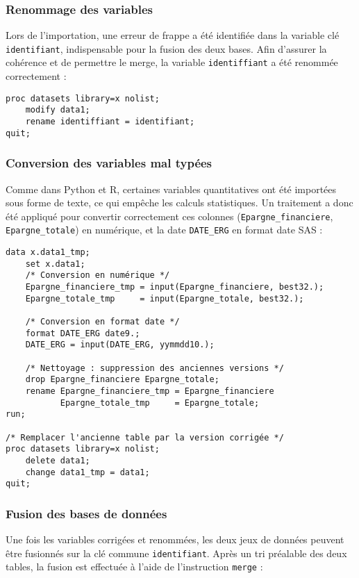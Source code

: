 \subsubsection{Renommage des variables}
Lors de l'importation, une erreur de frappe a été identifiée dans la variable clé \texttt{identifiant}, indispensable pour la fusion des deux bases.  
Afin d’assurer la cohérence et de permettre le merge, la variable \texttt{identiffiant} a été renommée correctement :

\begin{lstlisting}[caption=Correction d'une faute dans le nom de variable]
proc datasets library=x nolist;
    modify data1;
    rename identiffiant = identifiant;
quit; 
\end{lstlisting}

\subsubsection{Conversion des variables mal typées}
Comme dans Python et R, certaines variables quantitatives ont été importées sous forme de texte, ce qui empêche les calculs statistiques.  
Un traitement a donc été appliqué pour convertir correctement ces colonnes (\texttt{Epargne\_financiere}, \texttt{Epargne\_totale}) en numérique, et la date \texttt{DATE\_ERG} en format date SAS :

\begin{lstlisting}[caption=Conversion des variables en SAS]
data x.data1_tmp;
    set x.data1;
    /* Conversion en numérique */
    Epargne_financiere_tmp = input(Epargne_financiere, best32.);
    Epargne_totale_tmp     = input(Epargne_totale, best32.);

    /* Conversion en format date */
    format DATE_ERG date9.;
    DATE_ERG = input(DATE_ERG, yymmdd10.);

    /* Nettoyage : suppression des anciennes versions */
    drop Epargne_financiere Epargne_totale;
    rename Epargne_financiere_tmp = Epargne_financiere
           Epargne_totale_tmp     = Epargne_totale;
run;

/* Remplacer l'ancienne table par la version corrigée */
proc datasets library=x nolist;
    delete data1;
    change data1_tmp = data1;
quit;
\end{lstlisting}

\subsubsection{Fusion des bases de données}
Une fois les variables corrigées et renommées, les deux jeux de données peuvent être fusionnés sur la clé commune \texttt{identifiant}.  
Après un tri préalable des deux tables, la fusion est effectuée à l'aide de l'instruction \texttt{merge} :

